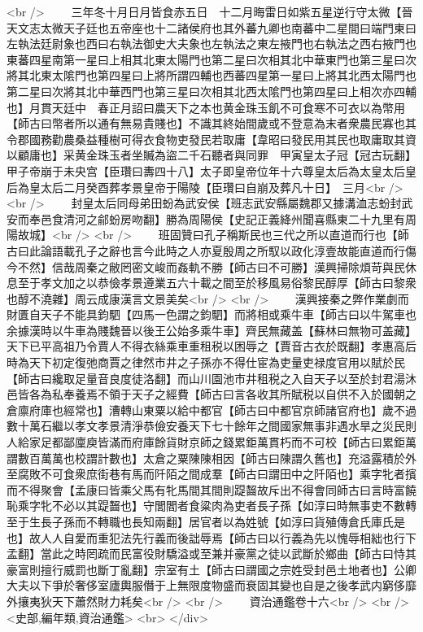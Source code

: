 <br />
　　三年冬十月日月皆食赤五日　十二月晦雷日如紫五星逆行守太微【晉天文志太微天子廷也五帝座也十二諸侯府也其外蕃九卿也南蕃中二星間曰端門東曰左執法廷尉象也西曰右執法御史大夫象也左執法之東左掖門也右執法之西右掖門也東蕃四星南第一星曰上相其北東太陽門也第二星曰次相其北中華東門也第三星曰次將其北東太隂門也第四星曰上將所謂四輔也西蕃四星第一星曰上將其北西太陽門也第二星曰次將其北中華西門也第三星曰次相其北西太隂門也第四星曰上相次亦四輔也】月貫天廷中　春正月詔曰農天下之本也黄金珠玉飢不可食寒不可衣以為幣用【師古曰幣者所以通有無易貴賤也】不識其終始間歲或不登意為末者衆農民寡也其令郡國務勸農桑益種樹可得衣食物吏發民若取庸【韋昭曰發民用其民也取庸取其資以顧庸也】采黄金珠玉者坐贓為盜二千石聽者與同罪　甲寅皇太子冠【冠古玩翻】　甲子帝崩于未央宫【臣瓚曰夀四十八】太子即皇帝位年十六尊皇太后為太皇太后皇后為皇太后二月癸酉葬孝景皇帝于陽陵【臣瓚曰自崩及葬凡十日】　三月<br />
<br />
　　封皇太后同母弟田蚡為武安侯【班志武安縣屬魏郡又據溝洫志蚡封武安而奉邑食清河之鄃蚡房吻翻】勝為周陽侯【史記正義絳州聞喜縣東二十九里有周陽故城】<br />
<br />
　　班固贊曰孔子稱斯民也三代之所以直道而行也【師古曰此論語載孔子之辭也言今此時之人亦夏殷周之所馭以政化淳壹故能直道而行傷今不然】信哉周秦之敝罔密文峻而姦軌不勝【師古曰不可勝】漢興掃除煩苛與民休息至于孝文加之以恭儉孝景遵業五六十載之間至於移風易俗黎民醇厚【師古曰黎衆也醇不澆雜】周云成康漢言文景美矣<br />
<br />
　　漢興接秦之弊作業劇而財匱自天子不能具鈞駟【四馬一色謂之鈞駟】而將相或乘牛車【師古曰以牛駕車也余據漢時以牛車為賤魏晉以後王公始多乘牛車】齊民無藏盖【蘇林曰無物可盖藏】天下已平高祖乃令賈人不得衣絲乘車重租税以困辱之【賈音古衣於既翻】孝惠高后時為天下初定復弛商賈之律然市井之子孫亦不得仕宦為吏量吏禄度官用以賦於民【師古曰纔取足量音良度徒洛翻】而山川園池市井租税之入自天子以至於封君湯沐邑皆各為私奉養焉不領于天子之經費【師古曰言各收其所賦税以自供不入於國朝之倉廪府庫也經常也】漕轉山東粟以給中都官【師古曰中都官京師諸官府也】歲不過數十萬石繼以孝文孝景清淨恭儉安養天下七十餘年之間國家無事非遇水旱之災民則人給家足都鄙廩庾皆滿而府庫餘貨財京師之錢累鉅萬貫朽而不可校【師古曰累鉅萬謂數百萬萬也校謂計數也】太倉之粟陳陳相因【師古曰陳謂久舊也】充溢露積於外至腐敗不可食衆庶街巷有馬而阡陌之間成羣【師古曰謂田中之阡陌也】乘字牝者擯而不得聚會【孟康曰皆乘父馬有牝馬間其間則踶齧故斥出不得會同師古曰言時富饒恥乘字牝不必以其踶齧也】守閭閻者食粱肉為吏者長子孫【如淳曰時無事吏不數轉至于生長子孫而不轉職也長知兩翻】居官者以為姓號【如淳曰貨殖傳倉氏庫氏是也】故人人自愛而重犯法先行義而後詘辱焉【師古曰以行義為先以愧辱相絀也行下孟翻】當此之時罔疏而民富役財驕溢或至兼并豪黨之徒以武斷於鄉曲【師古曰恃其豪富則擅行威罰也斷丁亂翻】宗室有土【師古曰謂國之宗姓受封邑土地者也】公卿大夫以下爭於奢侈室廬輿服僭于上無限度物盛而衰固其變也自是之後孝武内窮侈靡外攘夷狄天下蕭然財力耗矣<br />
<br />
　　資治通鑑卷十六<br />
<br />
<史部,編年類,資治通鑑>  <br>
   </div> 

